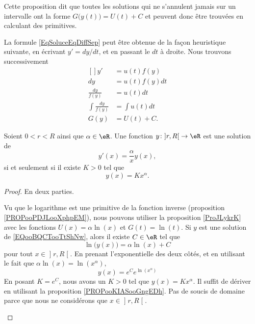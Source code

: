 Cette proposition dit que toutes les solutions qui ne s'annulent jamais sur un intervalle ont la forme \( G\big( y(t) \big)=U(t)+C\) et peuvent donc être trouvées en calculant des primitives.

La formule \eqref{EqSoluceEqDiffSep} peut être obtenue de la façon heuristique suivante, en écrivant \( y'=dy/dt\), et en passant le \( dt\) à droite. Nous trouvons successivement
\begin{equation}
	\begin{aligned}[]
		y'                      & =u(t)f(y)    \\
		dy                      & =u(t)f(y)dt  \\
		\frac{ dy }{ f(y) }     & =u(t)dt      \\
		\int\frac{ dy }{ f(y) } & =\int u(t)dt \\
		G(y)                    & =U(t)+C.
	\end{aligned}
\end{equation}


\begin{proposition}     \label{PROPooIGWTooULXrKI}
	Soient \( 0<r<R\) ainsi que \( \alpha\in \eR\). Une fonction \( y\colon \mathopen] r , R \mathclose[\to \eR\) est une solution de
	\begin{equation}        \label{EQooBQCTooTtShNw}
		y'(x)=\frac{ \alpha }{ x }y(x),
	\end{equation}
	si et seulement si il existe \( K >0\) tel que
	\begin{equation}
		y(x)=Kx^{\alpha}.
	\end{equation}
\end{proposition}

\begin{proof}
	En deux parties.
	\begin{subproof}
		\spitem[\( \Rightarrow\)]
		Vu que le logarithme est une primitive de la fonction inverse (proposition \ref{PROPooPDJLooXphpEM}), nous pouvons utiliser la proposition \ref{ProJLykrK} avec les fonctions \( U(x)=\alpha\ln(x)\) et \( G(t)=\ln(t)\). Si \( y\) est une solution de \eqref{EQooBQCTooTtShNw}, alors il existe \( C\in \eR\) tel que
		\begin{equation}
			\ln\big( y(x) \big)=\alpha\ln(x)+C
		\end{equation}
		pour tout \( x\in\mathopen] r , R \mathclose[\). En prenant l'exponentielle des deux côtés, et en utilisant le fait que \( \alpha\ln(x)=\ln(x^{\alpha})\),
			\begin{equation}
				y(x)= e^{C} e^{\ln(x^{\alpha})}
			\end{equation}
			En posant \( K=e^C\), nous avons un \( K>0\) tel que \( y(x)=Kx^{\alpha}\).
			\spitem[\( \Leftarrow\)]
			Il suffit de dériver en utilisant la proposition \ref{PROPooKIASooGngEDh}. Pas de soucis de domaine parce que nous ne considérons que \( x\in \mathopen] r , R \mathclose[\).
	\end{subproof}
\end{proof}

